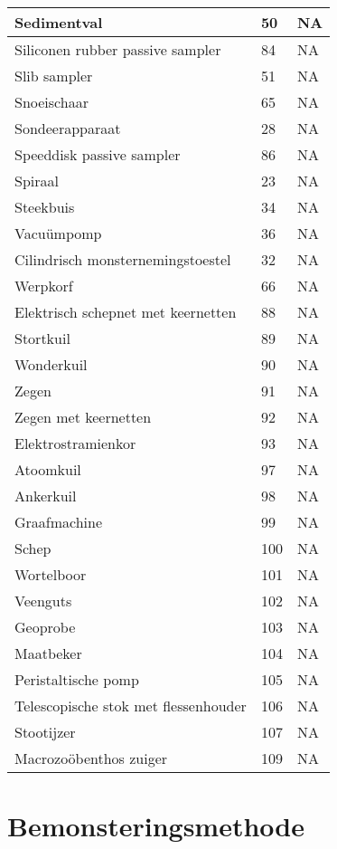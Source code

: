 \documentclass[
]{book}
\begin{document}
\begin{tabular}[t]{l|l|l}
\hline
Sedimentval & 50 & NA\\
\hline
Siliconen rubber passive sampler & 84 & NA\\
\hline
Slib sampler & 51 & NA\\
\hline
Snoeischaar & 65 & NA\\
\hline
Sondeerapparaat & 28 & NA\\
\hline
Speeddisk passive sampler & 86 & NA\\
\hline
Spiraal & 23 & NA\\
\hline
Steekbuis & 34 & NA\\
\hline
Vacuümpomp & 36 & NA\\
\hline
Cilindrisch monsternemingstoestel & 32 & NA\\
\hline
Werpkorf & 66 & NA\\
\hline
Elektrisch schepnet met keernetten & 88 & NA\\
\hline
Stortkuil & 89 & NA\\
\hline
Wonderkuil & 90 & NA\\
\hline
Zegen & 91 & NA\\
\hline
Zegen met keernetten & 92 & NA\\
\hline
Elektrostramienkor & 93 & NA\\
\hline
Atoomkuil & 97 & NA\\
\hline
Ankerkuil & 98 & NA\\
\hline
Graafmachine & 99 & NA\\
\hline
Schep & 100 & NA\\
\hline
Wortelboor & 101 & NA\\
\hline
Veenguts & 102 & NA\\
\hline
Geoprobe & 103 & NA\\
\hline
Maatbeker & 104 & NA\\
\hline
Peristaltische pomp & 105 & NA\\
\hline
Telescopische stok met flessenhouder & 106 & NA\\
\hline
Stootijzer & 107 & NA\\
\hline
Macrozoöbenthos zuiger & 109 & NA\\
\hline
\end{tabular}

\hypertarget{bemonsteringsmethode}{%
\section{Bemonsteringsmethode}\label{bemonsteringsmethode}}
\end{document}
